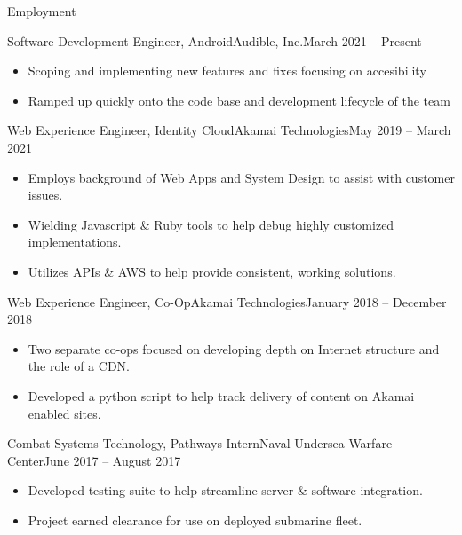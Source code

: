 \documentclass[]{mcdowellcv}
\begin{document}
	\makeheader
	
	\begin{cvsection}{Employment}
		\begin{cvsubsection}{Software Development Engineer, Android}{Audible, Inc.}{March 2021 -- Present}
		\vspace{2mm}
			\begin{itemize}
				\item Scoping and implementing new features and fixes focusing on accesibility
				\item Ramped up quickly onto the code base and development lifecycle of the team
			\end{itemize}
		\end{cvsubsection}
		\begin{cvsubsection}{Web Experience Engineer, Identity Cloud}{Akamai Technologies}{May 2019 -- March 2021}
		\vspace{2mm}
			\begin{itemize}
				\item Employs background of Web Apps and System Design to assist with customer issues.
				\item Wielding Javascript \& Ruby tools to help debug highly customized implementations.
				\item Utilizes APIs \& AWS to help provide consistent, working solutions.
			\end{itemize}
		\end{cvsubsection}
		
		\begin{cvsubsection}{Web Experience Engineer, Co-Op}{Akamai Technologies}{January 2018 -- December 2018}
		\vspace{2mm}
			\begin{itemize}
				\item Two separate co-ops focused on developing depth on Internet structure and the role of a CDN.
				\item Developed a python script to help track delivery of content on Akamai enabled sites.
			\end{itemize}
		\end{cvsubsection}
		
		\begin{cvsubsection}{Combat Systems Technology, Pathways Intern}{Naval Undersea Warfare Center}{June 2017 -- August 2017}
		\vspace{2mm}
			\begin{itemize}
				\item Developed testing suite to help streamline server \& software integration.
				\item Project earned clearance for use on deployed submarine fleet.
			\end{itemize}
		\end{cvsubsection}
		
	\end{cvsection}
	
\end{document}
